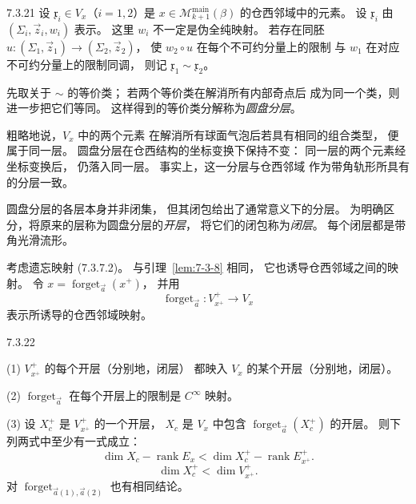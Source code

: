 
\begin{definition}{7.3.21}\label{def:7-3-21}
设 $\mathfrak x_i\in V_x$（$i=1,2$）是
$x\in\mathcal M^{\mathrm{main}}_{k+1}(\beta)$
的仓西邻域中的元素。
设 $\mathfrak x_i$ 由
$(\Sigma_i,\vec z_i,w_i)$ 表示。
这里 $w_i$ 不一定是伪全纯映射。
若存在同胚
$u\colon(\Sigma_1,\vec z_1)\to
(\Sigma_2,\vec z_2)$，
使 $w_2\circ u$ 在每个不可约分量上的限制
与 $w_1$ 在对应不可约分量上的限制同调，
则记 $\mathfrak x_1\sim\mathfrak x_2$。

先取关于 $\sim$ 的等价类；
若两个等价类在解消所有内部奇点后
成为同一个类，则进一步把它们等同。
这样得到的等价类分解称为\emph{圆盘分层}。
\end{definition}

粗略地说，$V_x$ 中的两个元素
在解消所有球面气泡后若具有相同的组合类型，
便属于同一层。
圆盘分层在仓西结构的坐标变换下保持不变：
同一层的两个元素经坐标变换后，
仍落入同一层。
事实上，这一分层与仓西邻域
作为带角轨形所具有的分层一致。

圆盘分层的各层本身并非闭集，
但其闭包给出了通常意义下的分层。
为明确区分，将原来的层称为圆盘分层的\emph{开层}，
将它们的闭包称为\emph{闭层}。
每个闭层都是带角光滑流形。

考虑遗忘映射 (7.3.7.2)。
与引理~\ref{lem:7-3-8} 相同，
它也诱导仓西邻域之间的映射。
令 $x=\operatorname{forget}_{\vec a}(x^+)$，
并用
\[
\operatorname{forget}_{\vec a}\colon
V_{x^+}^{+}\longrightarrow V_x
\]
表示所诱导的仓西邻域映射。

\begin{lemma}{7.3.22}\label{lem:7-3-22}
\par\noindent\textup{(1)}\quad
$V_{x^+}^{+}$ 的每个开层（分别地，闭层）
都映入 $V_x$ 的某个开层（分别地，闭层）。

\par\noindent\textup{(2)}\quad
$\operatorname{forget}_{\vec a}$
在每个开层上的限制是 $C^\infty$ 映射。

\par\noindent\textup{(3)}\quad
设 $X_c^+$ 是 $V_{x^+}^{+}$ 的一个开层，
$X_c$ 是 $V_x$ 中包含
$\operatorname{forget}_{\vec a}(X_c^+)$
的开层。
则下列两式中至少有一式成立：
\begin{equation}
\dim X_c-\operatorname{rank}E_x
<
\dim X_c^+-\operatorname{rank}E_{x^+}^{+}.
\tag{7.3.23.1}\label{eq:7-3-23-1}
\end{equation}
\begin{equation}
\dim X_c^+<\dim V_{x^+}^{+}.
\tag{7.3.23.2}\label{eq:7-3-23-2}
\end{equation}
对 $\operatorname{forget}_{\vec a(1),\vec a(2)}$
也有相同结论。
\end{lemma}

